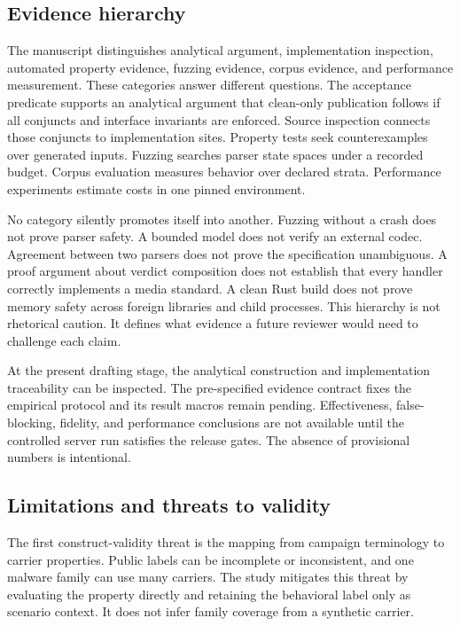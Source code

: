 \subsection{Evidence hierarchy}

The manuscript distinguishes analytical argument, implementation inspection,
automated property evidence, fuzzing evidence, corpus evidence, and performance
measurement. These categories answer different questions. The acceptance
predicate supports an analytical argument that clean-only publication follows
if all conjuncts and interface invariants are enforced. Source inspection
connects those conjuncts to implementation sites. Property tests seek
counterexamples over generated inputs. Fuzzing searches parser state spaces
under a recorded budget. Corpus evaluation measures behavior over declared
strata. Performance experiments estimate costs in one pinned environment.

No category silently promotes itself into another. Fuzzing without a crash does
not prove parser safety. A bounded model does not verify an external codec.
Agreement between two parsers does not prove the specification unambiguous. A
proof argument about verdict composition does not establish that every handler
correctly implements a media standard. A clean Rust build does not prove
memory safety across foreign libraries and child processes. This hierarchy is
not rhetorical caution. It defines what evidence a future reviewer would need
to challenge each claim.

At the present drafting stage, the analytical construction and implementation
traceability can be inspected. The pre-specified evidence contract fixes the
empirical protocol and its result macros remain pending. Effectiveness,
false-blocking, fidelity, and performance conclusions are not available until
the controlled server run satisfies the release gates. The absence of
provisional numbers is intentional.

\subsection{Limitations and threats to validity}

The first construct-validity threat is the mapping from campaign terminology to
carrier properties. Public labels can be incomplete or inconsistent, and one
malware family can use many carriers. The study mitigates this threat by
evaluating the property directly and retaining the behavioral label only as
scenario context. It does not infer family coverage from a synthetic carrier.

